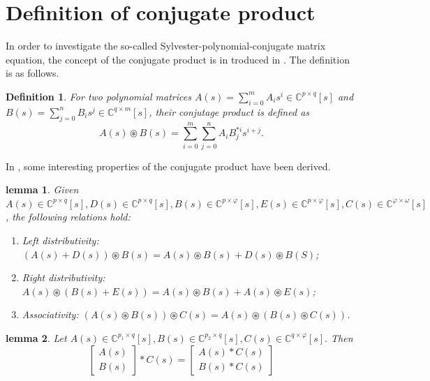 \documentclass[12pt,a4paper,fleqn,twoside]{article}
\newtheorem{definition}{Definition}
\newtheorem{lemma}{lemma}
\theoremstyle{plain}
\begin{document}
	\section{Definition of conjugate product}
	In order to investigate the so-called Sylvester-polynomial-conjugate matrix equation, the concept of the conjugate product is in troduced in \cite{1}. The definition is as follows.
	\begin{definition}\label{Definition 1}
		\textnormal{For two polynomial matrices $A(s)= \sum_{i=0}^{m}A_i s^i \in \mathbb{C}^{p\times q}[s]$ and $B(s)=\sum_{j=0}^{n}B_i s^j \in \mathbb{C}^{q\times m}[s]$, their conjutage product is defined as} 
		\begin{equation*}
			A(s)\circledast B(s)= \displaystyle \sum_{i=0}^{m} \sum_{j=0}^{n} A_i B^{*i}_j s^{i+j}.
		\end{equation*} 
	\end{definition}
	In \cite{1}, some interesting properties of the conjugate product have been derived.
	\begin{lemma}\label{lemma 1}
		Given $A(s) \in  \mathbb{C}^{p\times q}[s], D(s) \in \mathbb{C}^{p\times q}[s], B(s) \in \mathbb{C}^{p\times \varphi}[s],E(s) \in \mathbb{C}^{p\times \varphi}[s], C(s)\in \mathbb{C}^{\varphi \times \omega}[s]$, the following relations hold:\\
		\begin{enumerate}[\normalfont 1.]
			\item Left distributivity: $(A(s)+D(s)) \circledast B(s)= A(s) \circledast B(s) + D(s) \circledast B(S)$;
			\item Right distributivity: $A(s) \circledast (B(s) + E(s))= A(s) \circledast B(s) + A(s) \circledast E(s)$;
			\item Associativity: $(A(s) \circledast B(s))\circledast C(s)= A(s) \circledast (B(s) \circledast C(s))$.
		\end{enumerate}
	\end{lemma}
	\begin{lemma}
		Let $A(s) \in \mathbb{C}^{p_1 \times q}[s],B(s) \in \mathbb{C}^{p_2 \times q}[s], C(s) \in \mathbb{C}^{q \times \varphi}[s].$ Then
		\[
		\begin{bmatrix}
			A(s) \\
			B(s)
		\end{bmatrix}
		* C(s)=
		\begin{bmatrix}
			A(s) * C(s) \\
			B(s) * C(s)
		\end{bmatrix}\]
	\end{lemma}
\end{document}
